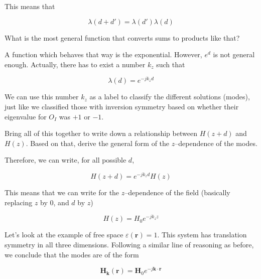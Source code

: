 This means that

\begin{equation}
\lambda(d + d')=\lambda(d')\lambda(d)
\end{equation} 

\begin{cue}
What is the most general function that converts sums to products like that?
\end{cue}

\noindent{}A function which behaves that way is the exponential. However, $e^d$ is not general enough. Actually, there has to exist a number $k_z$ such that

\begin{equation}
\lambda(d) = e^{-j k_z d}
\end{equation} 

We can use this number $k_z$ as a label to classify the different solutions (modes), just like we classified those with inversion symmetry based on whether their eigenvalue for $O_I$ was $+1$ or $-1$.

\begin{cue}
Bring all of this together to write down a relationship between $H(z + d)$ and $H(z)$. Based on that, derive the general form of the  $z$--dependence of the modes. 
\end{cue}

Therefore, we can write, for all possible $d$, 

\begin{equation}
H(z + d) = e^{-j k_z d}H(z) \label{eq-bloch-degenerate}
\end{equation} 

This means that we can write for the $z$--dependence of the field (basically replacing $z$ by 0, and $d$ by $z$)

\begin{equation}
H(z) = H_0 e^{-j k_z z}
\end{equation} 

Let's look at the example of free space $\varepsilon({\mathbf r})=1$. This system has translation symmetry in all three dimensions. Following a similar line of reasoning as before, we conclude that the modes are of the form

\begin{equation}
{\mathbf H}_{\mathbf k}({\mathbf r}) = {\mathbf H}_0 e^{-j {\mathbf k} \cdot {\mathbf r}} \label{eq-plane-wave}
\end{equation} 

